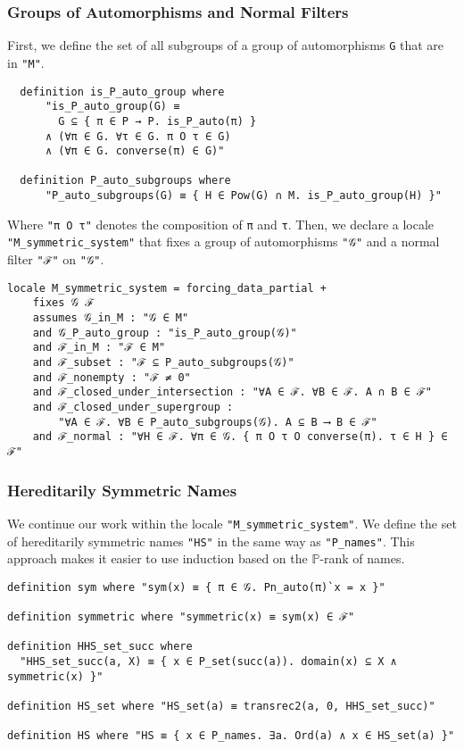 \documentclass{report}
\newenvironment{isaframe}{\begin{mdframed}[topline=false, rightline=false, bottomline=false]}{\end{mdframed}}
\begin{document}
\subsubsection{Groups of Automorphisms and Normal Filters}
First, we define the set of all subgroups of a group of automorphisms \texttt{G} that are in \texttt{"M"}.
\begin{isaframe}
\begin{verbatim}
  definition is_P_auto_group where 
      "is_P_auto_group(G) ≡ 
        G ⊆ { π ∈ P → P. is_P_auto(π) } 
      ∧ (∀π ∈ G. ∀τ ∈ G. π O τ ∈ G) 
      ∧ (∀π ∈ G. converse(π) ∈ G)"   
  
  definition P_auto_subgroups where 
      "P_auto_subgroups(G) ≡ { H ∈ Pow(G) ∩ M. is_P_auto_group(H) }" 
\end{verbatim}
\end{isaframe}
Where \texttt{"π O τ"} denotes the composition of \texttt{π} and \texttt{τ}.
Then, we declare a locale \texttt{"M\_symmetric\_system"} that fixes a group of automorphisms \texttt{"𝒢"} and a normal filter \texttt{"ℱ"} on \texttt{"𝒢"}.
\begin{isaframe}
\begin{verbatim}
locale M_symmetric_system = forcing_data_partial + 
    fixes 𝒢 ℱ 
    assumes 𝒢_in_M : "𝒢 ∈ M"  
    and 𝒢_P_auto_group : "is_P_auto_group(𝒢)"   
    and ℱ_in_M : "ℱ ∈ M"
    and ℱ_subset : "ℱ ⊆ P_auto_subgroups(𝒢)" 
    and ℱ_nonempty : "ℱ ≠ 0" 
    and ℱ_closed_under_intersection : "∀A ∈ ℱ. ∀B ∈ ℱ. A ∩ B ∈ ℱ" 
    and ℱ_closed_under_supergroup : 
        "∀A ∈ ℱ. ∀B ∈ P_auto_subgroups(𝒢). A ⊆ B ⟶ B ∈ ℱ" 
    and ℱ_normal : "∀H ∈ ℱ. ∀π ∈ 𝒢. { π O τ O converse(π). τ ∈ H } ∈ ℱ" 
\end{verbatim}
\end{isaframe}


\subsubsection{Hereditarily Symmetric Names}
We continue our work within the locale \texttt{"M\_symmetric\_system"}.
We define the set of hereditarily symmetric names \texttt{"HS"} in the same way as \texttt{"P\_names"}.
This approach makes it easier to use induction based on the $\mathbb{P}$-rank of names.

\begin{isaframe}
\begin{verbatim}
definition sym where "sym(x) ≡ { π ∈ 𝒢. Pn_auto(π)`x = x }"  

definition symmetric where "symmetric(x) ≡ sym(x) ∈ ℱ"  

definition HHS_set_succ where 
  "HHS_set_succ(a, X) ≡ { x ∈ P_set(succ(a)). domain(x) ⊆ X ∧ symmetric(x) }" 

definition HS_set where "HS_set(a) ≡ transrec2(a, 0, HHS_set_succ)"

definition HS where "HS ≡ { x ∈ P_names. ∃a. Ord(a) ∧ x ∈ HS_set(a) }" 
\end{verbatim}
\end{isaframe}
\end{document}

